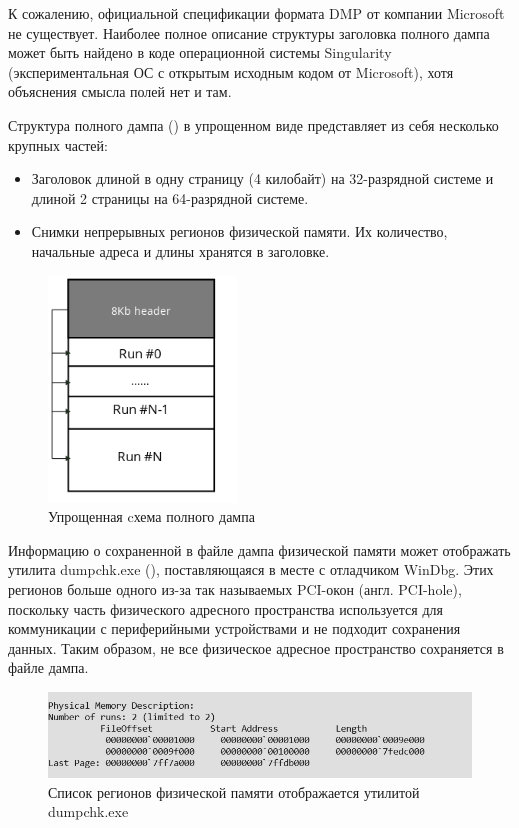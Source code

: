 \documentclass{mipt-thesis-bs}
\begin{document}
К сожалению, официальной спецификации формата DMP от компании Microsoft не существует. Наиболее полное описание структуры заголовка полного дампа может быть найдено в коде операционной системы Singularity (экспериментальная ОС с открытым исходным кодом от Microsoft)\cite{mssing}, хотя объяснения смысла полей нет и там.

Структура полного дампа () в упрощенном виде представляет из себя несколько крупных частей:

\begin{itemize}
    \item Заголовок длиной в одну страницу (4 килобайт) на 32-разрядной системе и длиной 2 страницы на 64-разрядной системе.
    \item Снимки непрерывных регионов физической памяти. Их количество, начальные адреса и длины хранятся в заголовке.
\end{itemize}

\begin{figure}[h]
\begin{center}
    \includegraphics[width=5cm]{dmp_scheme1.png}
    \caption{Упрощенная cхема полного дампа}
    \label{fig:dmp-scheme}
\end{center}
\end{figure}

Информацию о сохраненной в файле дампа физической памяти может отображать утилита dumpchk.exe (), поставляющаяся в месте с отладчиком WinDbg. Этих регионов больше одного из-за так называемых PCI-окон (англ. PCI-hole), поскольку часть физического адресного пространства используется для коммуникации с периферийными устройствами и не подходит сохранения данных. Таким образом, не все физическое адресное пространство сохраняется в файле дампа.

\begin{figure}[h]
\begin{center}
    \includegraphics[width=1\textwidth]{runs.png}
    \caption{Список регионов физической памяти отображается утилитой dumpchk.exe}
    \label{fig:runs}
\end{center}
\end{figure}
\end{document}

